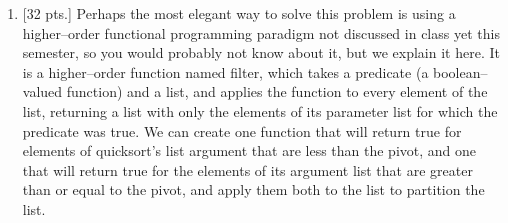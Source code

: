 \documentclass[11pt,fleqn]{article}
\begin{document}
\begin{enumerate}
\begin{info}{\textbf{\underline{Grading notes:}}}
\begin{itemize}
\begin{multicols}{4}
                      \verb@a < > g@

                      \verb@a <@

                      \columnbreak

                      \verb@a < |& > f@

                      \columnbreak

                      \verb@a |&@

                    \end{multicols}

                    \vspace{-3mm}

              \item There's no penalty for extra productions.  In other words,
                    the grammar need not be minimal, so do not deduct for
                    having useless nonterminals, etc.  For example, a grammar
                    with productions like the following is fine:
                    \begin{grammar}
                      \\
                    \end{grammar}

              \item If a grammar is given that omits input redirection
                    entirely (the suggestion in the last sentence of the
                    problem description), the answer should lose 
                    for precedence and  for completeness, plus any
                    other deductions for other mistakes in the grammar.

            \end{itemize}

            \vspace{-2.5mm}

          \end{info}


    \item {[32 pts.]} Perhaps the most elegant way to solve this problem is
          using a higher--order functional programming paradigm not
          discussed in class yet this semester, so you would probably not
          know about it, but we explain it here.  It is a higher--order
          function named filter, which takes a predicate (a boolean--valued
          function) and a list, and applies the function to every element of
          the list, returning a list with only the elements of its parameter
          list for which the predicate was true.  We can create one function
          that will return true for elements of quicksort's list argument
          that are less than the pivot, and one that will return true for
          the elements of its argument list that are greater than or equal
          to the pivot, and apply them both to the list to partition the
          list.


\end{enumerate}
\end{document}
